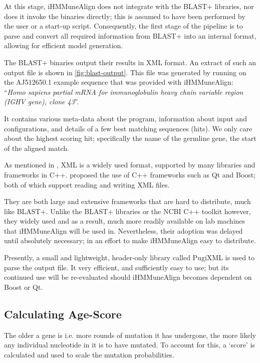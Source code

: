At this stage, iHMMuneAlign does not integrate with the BLAST+ libraries, nor does it invoke the binaries directly; this is assumed to have been performed by the user or a start-up script. Consequently, the first stage of the pipeline is to parse and convert all required information from BLAST+ into an internal format, allowing for efficient model generation.

The BLAST+ binaries output their results in XML format. An extract of such an output file is shown in \autoref{fig:blast-output}. This file was generated by running  on the AJ512650.1 example sequence that was provided with iHMMuneAlign: ``\emph{Homo sapiens partial mRNA for immunoglobulin heavy chain variable region (IGHV gene), clone 43}''.

It contains various meta-data about the program, information about input and configurations, and details of a few best matching sequences (hits). We only care about the highest scoring hit; specifically the name of the germline gene, the start of the aligned match.

As mentioned in , XML is a widely used format, supported by many libraries and frameworks in C++. 
 proposed the use of C++ frameworks such as Qt\autocite{qt} and Boost\autocite{boost}; both of which support reading and writing XML files. 

They are both large and extensive frameworks that are hard to distribute, much like BLAST+. Unlike the BLAST+ libraries or the NCBI C++ toolkit however, they widely used and as a result, much more readily available on lab machines that iHMMuneAlign will be used in. Nevertheless, their adoption was delayed until absolutely necessary; in an effort to make iHMMuneAlign easy to distribute.

Presently, a small and lightweight, header-only library called PugiXML\cite{pugixml} is used to parse the  output file. It very efficient, and sufficiently easy to use; but its continued use will be re-evaluated should iHMMuneAlign becomes dependent on Boost or Qt.

\subsection{Calculating Age-Score}
\label{sec:pipeline-stage_2}
The older a gene is i.e. more rounds of mutation it has undergone, the more likely any individual nucleotide in it is to have mutated. To account for this, a `score' is calculated and used to scale the mutation probabilities. 

